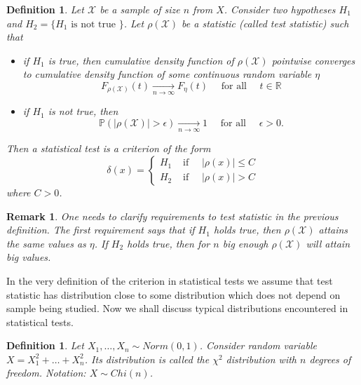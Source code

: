 \documentclass[12pt]{article}
\newtheorem{remark}[theorem]{Remark}
\newtheorem{definition}[theorem]{Definition}
\begin{document}
\begin{definition} Let $\mathscr{X}$ be a sample of size $n$ from $X$. Consider
    two hypotheses $H_1$ and $H_2=\{H_1\mbox{ is not true }\}$. Let
    $\rho(\mathscr{X})$ be a statistic (called test statistic) such that
    \begin{itemize}
        \item if $H_1$ is true, then cumulative density function of
              $\rho(\mathscr{X})$ pointwise converges to cumulative density
              function of some continuous random variable $\eta$
              $$
                  F_{\rho(\mathscr{X})}(t)\underset{n\to\infty}{\to}F_{\eta}(t)
                  \quad\mbox{ for all }\quad t\in\mathbb{R}
              $$
        \item if $H_1$ is not true, then
              $$
                  \mathbb{P}(|\rho(\mathscr{X})|>\epsilon)
                  \underset{n\to\infty}{\to} 1
                  \quad\mbox{ for all }\quad \epsilon>0.
              $$
    \end{itemize}
    Then a statistical test is a criterion of the form
    $$
        \delta(x)=
        \begin{cases}
            H_1 & \mbox{ if }\quad |\rho(x)|\leq C \\
            H_2 & \mbox{ if }\quad |\rho(x)|> C
        \end{cases}
    $$
    where $C>0$.
\end{definition}

\begin{remark} One needs to clarify requirements to test statistic in the
    previous definition. The first requirement says that if $H_1$ holds true,
    then $\rho(\mathscr{X})$ attains the same values as $\eta$. If $H_2$ holds
    true, then for $n$ big enough $\rho(\mathscr{X})$ will attain big values.
\end{remark}

In the very definition of the criterion in statistical tests we assume that test
statistic has distribution close to some distribution which does not depend on
sample being studied. Now we shall discuss typical distributions encountered in
statistical tests.

\begin{definition} Let $X_1,\ldots,X_n\sim Norm(0, 1)$. Consider random variable
    $X=X_1^2+\ldots+X_n^2$.  %
    Its distribution is called the $\chi^2$ distribution
    with $n$ degrees of freedom. Notation: $X\sim Chi(n)$.
\end{definition}
\end{document}
